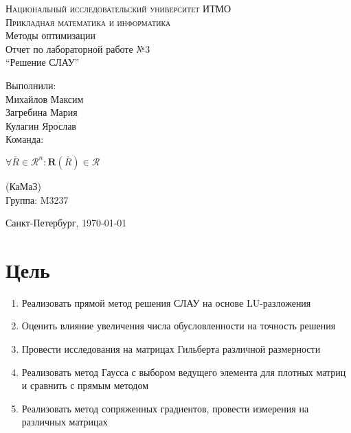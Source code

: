 





\begin{titlepage}
	\begin{center}
		\textsc{Национальный исследовательский университет ИТМО\\
			Прикладная математика и информатика}\\[5cm]

		\huge{Методы оптимизации\\[6mm]
			\large Отчет по лабораторной работе №3\\
			``Решение СЛАУ''\\[4cm]

		}
	\end{center}

	\begin{flushright}
		\begin{minipage}{0.25\textwidth}
			Выполнили:\\[2mm]
			Михайлов Максим\\
			Загребина Мария\\
			Кулагин Ярослав\\[2mm]
			Команда:

			\(\forall \bar R \in \mathscr{R}^n : \mathrm{\textbf{R}}(\bar R) \in \mathscr{R}\)

			(КаМаЗ)\\[2mm]
			Группа: M3237
		\end{minipage}
	\end{flushright}

	\vfill
	\begin{center}
		Санкт-Петербург, \today
	\end{center}
\end{titlepage}





\section{Цель}
\begin{enumerate}
	\item Реализовать прямой метод решения СЛАУ на основе LU-разложения
	\item Оценить влияние увеличения числа обусловленности на
	      точность решения
	\item Провести исследования на матрицах Гильберта различной
	      размерности
	\item Реализовать метод Гаусса с выбором ведущего элемента для плотных
	      матриц и сравнить с прямым методом
	\item Реализовать метод сопряженных градиентов, провести измерения на различных матрицах
\end{enumerate}
